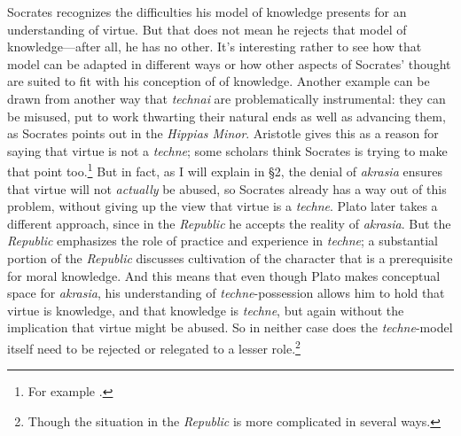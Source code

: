 ﻿\documentclass[11pt]{amsart}
\begin{document}
Socrates recognizes the difficulties his model of knowledge presents for an understanding of virtue. But that does not mean he rejects that model of knowledge---after all, he has no other. It's interesting rather to see how that model can be adapted in different ways or how other aspects of Socrates' thought are suited to fit with his conception of of knowledge. Another example can be drawn from another way that \emph{technai} are problematically instrumental: they can be misused, put to work thwarting their natural ends as well as advancing them, as Socrates points out in the \emph{Hippias Minor}. Aristotle gives this as a reason for saying that virtue is not a \emph{techne}; some scholars think Socrates is trying to make that point too.\footnote{For example \citet[29]{allen1996pih}.} But in fact, as I will explain in \S2, the denial of \emph{akrasia} ensures that virtue will not \emph{actually} be abused, so Socrates already has a way out of this problem, without giving up the view that virtue is a \emph{techne}. Plato later takes a different approach, since in the \emph{Republic} he accepts the reality of \emph{akrasia}. But the \emph{Republic} emphasizes the role of practice and experience in \emph{techne}; a substantial portion of the \emph{Republic} discusses cultivation of the character that is a prerequisite for moral knowledge. And this means that even though Plato makes conceptual space for \emph{akrasia}, his understanding of \emph{techne}-possession allows him to hold that virtue is knowledge, and that knowledge is \emph{techne}, but again without the implication that virtue might be abused. So in neither case does the \emph{techne}-model itself need to be rejected or relegated to a lesser role.\footnote{Though the situation in the \emph{Republic} is more complicated in several ways.}




\end{document}
